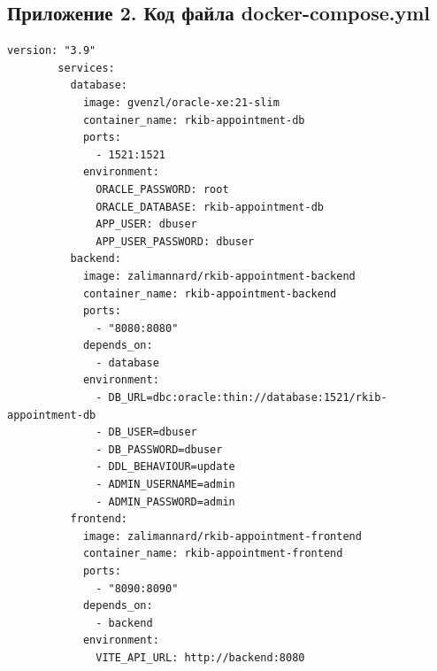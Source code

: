 \documentclass[a4paper,article]{article}
\begin{document}
\begin{sloppypar}
\begin{appendices}
        \section*{Приложение 2. Код файла docker-compose.yml}\label{dockercomposeyml}
        \setcounter{section}{2}
        \begin{lstlisting}[]
        version: "3.9"
        services:
          database:
            image: gvenzl/oracle-xe:21-slim
            container_name: rkib-appointment-db
            ports:
              - 1521:1521
            environment:
              ORACLE_PASSWORD: root
              ORACLE_DATABASE: rkib-appointment-db
              APP_USER: dbuser
              APP_USER_PASSWORD: dbuser
          backend:
            image: zalimannard/rkib-appointment-backend
            container_name: rkib-appointment-backend
            ports:
              - "8080:8080"
            depends_on:
              - database
            environment:
              - DB_URL=dbc:oracle:thin://database:1521/rkib-appointment-db
              - DB_USER=dbuser
              - DB_PASSWORD=dbuser
              - DDL_BEHAVIOUR=update
              - ADMIN_USERNAME=admin
              - ADMIN_PASSWORD=admin
          frontend:
            image: zalimannard/rkib-appointment-frontend
            container_name: rkib-appointment-frontend
            ports:
              - "8090:8090"
            depends_on:
              - backend
            environment:
              VITE_API_URL: http://backend:8080
        \end{lstlisting}
    \end{appendices}

\end{sloppypar}
\end{document}
